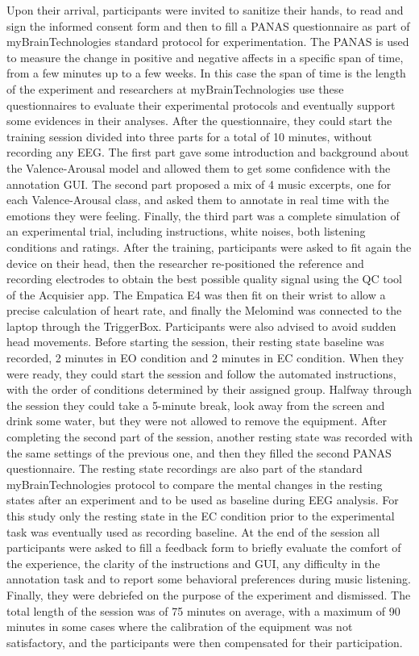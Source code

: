 Upon their arrival, participants were invited to sanitize their hands, to read and sign the informed consent form and then to fill a PANAS questionnaire \cite{watson_development_nodate} as part of myBrainTechnologies standard protocol for experimentation. The PANAS is used to measure the change in positive and negative affects in a specific span of time, from a few minutes up to a few weeks. In this case the span of time is the length of the experiment and researchers at myBrainTechnologies use these questionnaires to evaluate their experimental protocols and eventually support some evidences in their analyses. After the questionnaire, they could start the training session divided into three parts for a total of 10 minutes, without recording any \ac{EEG}. The first part gave some introduction and background about the Valence-Arousal model and allowed them to get some confidence with the annotation GUI. The second part proposed a mix of 4 music excerpts, one for each Valence-Arousal class, and asked them to annotate in real time with the emotions they were feeling. Finally, the third part was a complete simulation of an experimental trial, including instructions, white noises, both listening conditions and ratings. After the training, participants were asked to fit again the device on their head, then the researcher re-positioned the reference and recording electrodes to obtain the best possible quality signal using the \ac{QC} tool of the Acquisier app. The Empatica E4 was then fit on their wrist to allow a precise calculation of heart rate, and finally the Melomind was connected to the laptop through the TriggerBox. Participants were also advised to avoid sudden head movements. Before starting the session, their resting state baseline was recorded, 2 minutes in \ac{EO} condition and 2 minutes in \ac{EC} condition. When they were ready, they could start the session and follow the automated instructions, with the order of conditions determined by their assigned group. Halfway through the session they could take a 5-minute break, look away from the screen and drink some water, but they were not allowed to remove the equipment. After completing the second part of the session, another resting state was recorded with the same settings of the previous one, and then they filled the second PANAS questionnaire. The resting state recordings are also part of the standard myBrainTechnologies protocol to compare the mental changes in the resting states after an experiment and to be used as baseline during \ac{EEG} analysis. For this study only the resting state in the \ac{EC} condition prior to the experimental task was eventually used as recording baseline. At the end of the session all participants were asked to fill a feedback form to briefly evaluate the comfort of the experience, the clarity of the instructions and GUI, any difficulty in the annotation task and to report some behavioral preferences during music listening. Finally, they were debriefed on the purpose of the experiment and dismissed. The total length of the session was of 75 minutes on average, with a maximum of 90 minutes in some cases where the calibration of the equipment was not satisfactory, and the participants were then compensated for their participation.

